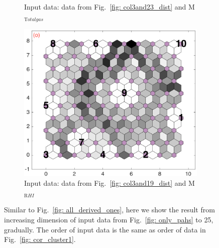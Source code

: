 \begin{figure}
\begin{subfigure}[b]{0.25\textwidth}
        \caption{Input data: data from Fig.~\ref{fig: col3and23_dist} and M$_{{\mathrm Total gas}}$}
        \label{fig: col3and24_dist}
    \end{subfigure}
            \hfill
    \begin{subfigure}[b]{0.25\textwidth}
        \centering
        \includegraphics[width=\textwidth ]{../../images0.01/M31/2D/diff_dimension/combine_2D_data_between_cols3and25.png}
        \caption{Input data: data from Fig.~\ref{fig: col3and19_dist} and M$_{{\mathrm RHI}}$}
        \label{fig: col3and25_dist}
    \end{subfigure}
    \caption{Similar to Fig.~\ref{fig: all_derived_ones}, here we show the result from increasing dimension of input data from Fig.~\ref{fig: only_pahs} to 25, gradually. The order of input data is the same as order of data in Fig.~\ref{fig: cor_cluster1}.}
    \label{fig: inc_D_col3s}
\end{figure}